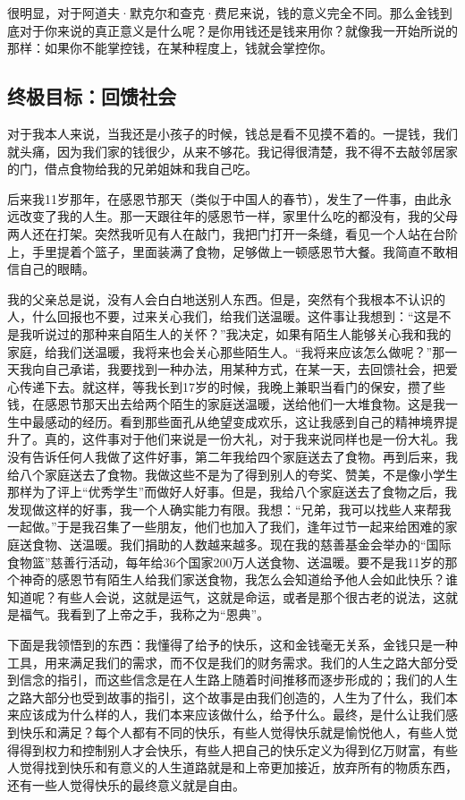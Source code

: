 很明显，对于阿道夫·默克尔和查克·费尼来说，钱的意义完全不同。那么金钱到底对于你来说的真正意义是什么呢？是你用钱还是钱来用你？就像我一开始所说的那样：如果你不能掌控钱，在某种程度上，钱就会掌控你。

\subsection{终极目标：回馈社会}

对于我本人来说，当我还是小孩子的时候，钱总是看不见摸不着的。一提钱，我们就头痛，因为我们家的钱很少，从来不够花。我记得很清楚，我不得不去敲邻居家的门，借点食物给我的兄弟姐妹和我自己吃。

后来我11岁那年，在感恩节那天（类似于中国人的春节），发生了一件事，由此永远改变了我的人生。那一天跟往年的感恩节一样，家里什么吃的都没有，我的父母两人还在打架。突然我听见有人在敲门，我把门打开一条缝，看见一个人站在台阶上，手里提着个篮子，里面装满了食物，足够做上一顿感恩节大餐。我简直不敢相信自己的眼睛。

我的父亲总是说，没有人会白白地送别人东西。但是，突然有个我根本不认识的人，什么回报也不要，过来关心我们，给我们送温暖。这件事让我想到：“这是不是我听说过的那种来自陌生人的关怀？”我决定，如果有陌生人能够关心我和我的家庭，给我们送温暖，我将来也会关心那些陌生人。“我将来应该怎么做呢？”那一天我向自己承诺，我要找到一种办法，用某种方式，在某一天，去回馈社会，把爱心传递下去。就这样，等我长到17岁的时候，我晚上兼职当看门的保安，攒了些钱，在感恩节那天出去给两个陌生的家庭送温暖，送给他们一大堆食物。这是我一生中最感动的经历。看到那些面孔从绝望变成欢乐，这让我感到自己的精神境界提升了。真的，这件事对于他们来说是一份大礼，对于我来说同样也是一份大礼。我没有告诉任何人我做了这件好事，第二年我给四个家庭送去了食物。再到后来，我给八个家庭送去了食物。我做这些不是为了得到别人的夸奖、赞美，不是像小学生那样为了评上“优秀学生”而做好人好事。但是，我给八个家庭送去了食物之后，我发现做这样的好事，我一个人确实能力有限。我想：“兄弟，我可以找些人来帮我一起做。”于是我召集了一些朋友，他们也加入了我们，逢年过节一起来给困难的家庭送食物、送温暖。我们捐助的人数越来越多。现在我的慈善基金会举办的“国际食物篮”慈善行活动，每年给36个国家200万人送食物、送温暖。要不是我11岁的那个神奇的感恩节有陌生人给我们家送食物，我怎么会知道给予他人会如此快乐？谁知道呢？有些人会说，这就是运气，这就是命运，或者是那个很古老的说法，这就是福气。我看到了上帝之手，我称之为“恩典”。

下面是我领悟到的东西：我懂得了给予的快乐，这和金钱毫无关系，金钱只是一种工具，用来满足我们的需求，而不仅是我们的财务需求。我们的人生之路大部分受到信念的指引，而这些信念是在人生路上随着时间推移而逐步形成的；我们的人生之路大部分也受到故事的指引，这个故事是由我们创造的，人生为了什么，我们本来应该成为什么样的人，我们本来应该做什么，给予什么。最终，是什么让我们感到快乐和满足？每个人都有不同的快乐，有些人觉得快乐就是愉悦他人，有些人觉得得到权力和控制别人才会快乐，有些人把自己的快乐定义为得到亿万财富，有些人觉得找到快乐和有意义的人生道路就是和上帝更加接近，放弃所有的物质东西，还有一些人觉得快乐的最终意义就是自由。

